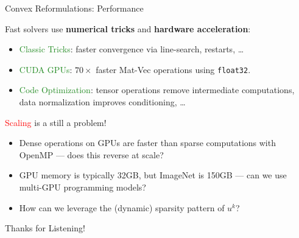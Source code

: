 \documentclass[usenames,dvipsnames,mathserif,notheorems]{beamer}
\begin{document}
\begin{frame}{Convex Reformulations: Performance}

	Fast solvers use \textbf{numerical tricks} and \textbf{hardware acceleration}:
	\vspace{1em}
	\begin{itemize}
		\item \textcolor{ForestGreen}{Classic Tricks}: faster convergence via line-search, restarts, \ldots
		\item \textcolor{ForestGreen}{CUDA GPUs}: \( 70\times \) faster Mat-Vec operations using \texttt{float32}.
		\item \textcolor{ForestGreen}{Code Optimization}: tensor operations remove intermediate computations,
		      data normalization improves conditioning, \ldots
	\end{itemize}
	\vspace{1em}

	\textcolor{red}{Scaling} is a still a problem!
	\begin{itemize}
		\item Dense operations on GPUs are faster than sparse computations with OpenMP --- does this reverse at scale?
		\item GPU memory is typically 32GB, but ImageNet is 150GB --- can we use multi-GPU programming models?
		\item How can we leverage the (dynamic) sparsity pattern of \( u^k \)?
	\end{itemize}

\end{frame}



\begin{frame}{}
	\begin{center}
		\huge Thanks for Listening!
	\end{center}
\end{frame}
\end{document}
